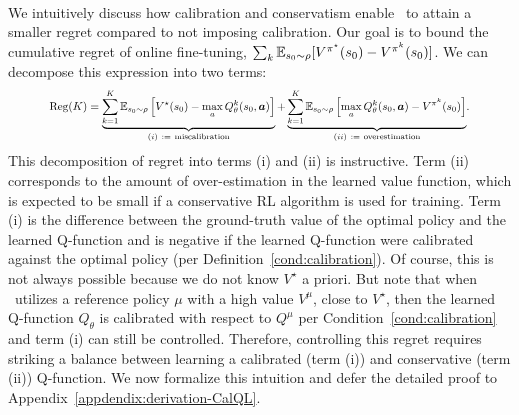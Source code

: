 
~

 We intuitively discuss how calibration and conservatism enable \methodname\ to attain a smaller regret compared to not imposing calibration. Our goal is to bound the cumulative regret of online fine-tuning, ${\sum_{k} \mathbb{E}_{s_0 \sim \rho}[V^{\pi^\star}(s_0) - V^{\pi^k}(s_0)]}$. We can decompose this expression into two terms: 
\vspace{-0.05cm}
\begin{align}
    \resizebox{.87\textwidth}{!}{$\regret(K) = \underbrace{\sum_{k=1}^K \mathbb{E}_{\bs_0 \sim \rho} \brac{V^{\star}(\bs_0) -\max_a {Q}_{\theta}^k(\bs_0,\mathbf{a})}}_{(i) ~:=~ \text{miscalibration}}
    +\underbrace{\sum_{k=1}^K \mathbb{E}_{\bs_0 \sim \rho} \brac{ \max_a {Q}_{\theta}^k(\bs_0,\mathbf{a}) - V^{\pi^{k}}(\bs_0)}}_{(ii) ~:=~ \text{overestimation}}$.}
\label{eq:regret-decomposition}
\end{align}
This decomposition of regret into terms (i) and (ii) is instructive. Term (ii) corresponds to the amount of over-estimation in the learned value function, which is expected to be small if a conservative RL algorithm is used for training. Term (i) is the difference between the ground-truth value of the optimal policy and the learned Q-function and is negative if the learned Q-function were calibrated against the optimal policy (per Definition~\ref{cond:calibration}). Of course, this is not always possible because we do not know $V^\star$ a priori. But note that when \methodname\ utilizes a reference policy $\mu$ with a high value $V^\mu$, close to $V^\star$, then the learned Q-function $Q_\theta$ is calibrated with respect to $Q^\mu$ per Condition~\ref{cond:calibration} and term (i) can still be controlled. Therefore, controlling this regret requires striking a balance between learning a calibrated (term (i)) and conservative (term (ii)) Q-function. We now formalize this intuition and defer the detailed proof to Appendix~\ref{appdendix:derivation-CalQL}. 


